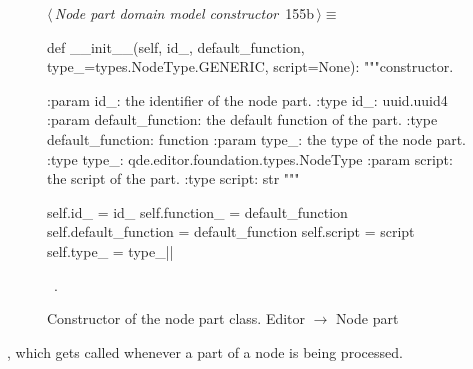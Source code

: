 \documentclass[%
    a4paper,    %
    justified,  %
    nobib,      %
    openany     %
]{tufte-book}
\makeatletter
\renewcommand{\label}[1]{\@tufte@label{##1}}%
\makeatother
\begin{document}
\begin{figure}[!htbp]
\begin{flushleft} \small
\begin{minipage}{\linewidth}\label{scrap115}\raggedright\small
{} $\langle\,${\itshape Node part domain model constructor}\nobreak\ {\footnotesize {155b}}$\,\rangle\equiv$
\vspace{-1ex}
\begin{pythoncode}
  def __init__(self, id_, default_function,
               type_=types.NodeType.GENERIC, script=None):
    """constructor.

    :param id_: the identifier of the node part.
    :type  id_: uuid.uuid4
    :param default_function: the default function of the part.
    :type default_function: function
    :param type_: the type of the node part.
    :type type_: qde.editor.foundation.types.NodeType
    :param script: the script of the part.
    :type script: str
    """

    self.id_              = id_
    self.function_        = default_function
    self.default_function = default_function
    self.script           = script
    self.type_            = type_|\NWsep|
\end{pythoncode}
\vspace{1.5ex}
\footnotesize
\begin{list}{}{\setlength{\itemsep}{-\parsep}\setlength{\itemindent}{-\leftmargin}}
\item \NWtxtMacroRefIn\ .

\item{}
\end{list}
\end{minipage}\vspace{4ex}
\end{flushleft}
\caption{Constructor of the node part class.
  \newline{}\newline{}Editor $\rightarrow$ Node part}
\end{figure}

, which gets called whenever a part
of a node is being processed.
\end{document}
